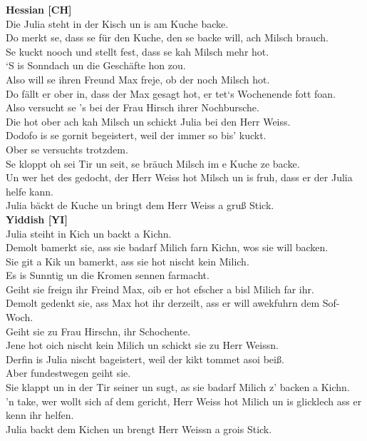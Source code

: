 \documentclass[output=paper]{LSP/langsci}
\begin{document}
\small{
\noindent\textbf{Hessian [CH]}\\
Die Julia steht in der Kisch un is am Kuche backe.\\
Do merkt se, dass se f\"ur den Kuche, den se backe will, ach Milsch brauch.\\
Se kuckt nooch und stellt fest, dass se kah Milsch mehr hot. \\
‘S is Sonndach un die Gesch\"afte hon zou.\\
Also will se ihren Freund Max freje, ob der noch Milsch hot.\\
Do f\"allt er ober in, dass der Max gesagt hot, er tet`s Wochenende fott foan.\\
Also versucht se ’s bei der Frau Hirsch ihrer Nochbursche.\\
Die hot ober ach kah Milsch un schickt Julia bei den Herr Weiss.\\
Dodofo is se gornit begeistert, weil der immer so bis’ kuckt.\\
Ober se versuchts trotzdem.\\
Se kloppt oh sei Tir un seit, se br\"auch Milsch im e Kuche ze backe.\\
Un wer het des gedocht, der Herr Weiss hot Milsch un is fruh, dass er der Julia helfe kann.\\
Julia b\"ackt de Kuche un bringt dem Herr Weiss a gruß Stick.\\

\largerpage
\noindent\textbf{Yiddish [YI]}\\
Julia steiht in Kich un backt a Kichn.\\
Demolt bamerkt sie, ass sie badarf Milich farn Kichn, wos sie will backen.\\
Sie git a Kik un bamerkt, ass sie hot nischt kein Milich.\\
Es is Sunntig un die Kromen sennen farmacht.\\
Geiht sie freign ihr Freind Max, oib er hot efscher a bisl Milich far ihr.\\
Demolt gedenkt sie, ass Max hot ihr derzeilt, ass er will awekfuhrn dem Sof-Woch.\\
Geiht sie zu Frau Hirschn, ihr Schochente.\\
Jene hot oich nischt kein Milich un schickt sie zu Herr Weissn.\\
Derfin is Julia nischt bageistert, weil der kikt tommet asoi beiß.\\
Aber fundestwegen geiht sie.\\
Sie klappt un in der Tir seiner un sugt, as sie badarf Milich z' backen a Kichn.\\
'n take, wer wollt sich af dem gericht, Herr Weiss hot Milich un is glicklech ass er kenn ihr helfen.\\
Julia backt dem Kichen un brengt Herr Weissn a grois Stick.\\


}
\end{document}
